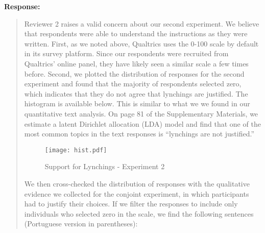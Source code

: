 \documentclass[a4paper,12pt]{article}
\begin{document}
\noindent \textbf{Response:} 
\begin{quote}

Reviewer 2 raises a valid concern about our second experiment. We believe that
respondents were able to understand the instructions as they were written.
First, as we noted above, Qualtrics uses the 0-100 scale by default in its
survey platform. Since our respondents were recruited from Qualtrics' online
panel, they have likely seen a similar scale a few times before. Second, we
plotted the distribution of responses for the second experiment and found that
the majority of respondents selected zero, which indicates that they do not
agree that lynchings are justified. The histogram is available below. This is
similar to what we we found in our quantitative text analysis. On page 81 of
the Supplementary Materials, we estimate a latent Dirichlet allocation (LDA)
model and find that one of the most common topics in the text responses is
``lynchings are not justified.''

\begin{figure}
  \centering
  \texttt{[image: hist.pdf]}
  \caption{Support for Lynchings - Experiment 2}
  \label{fig:hist}
\end{figure}

We then cross-checked the distribution of responses with the qualitative
evidence we collected for the conjoint experiment, in which participants had to
justify their choices. If we filter the responses to include only individuals
who selected zero in the scale, we find the following sentences (Portuguese
version in parentheses): 

\begin{itemize}


\end{itemize}
\end{quote}
\end{document}

